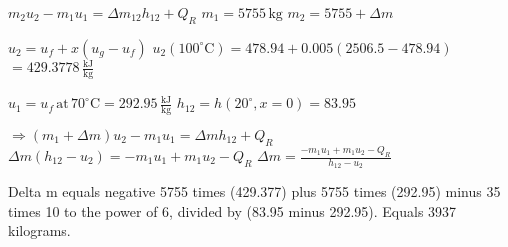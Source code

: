 \( m_2 u_2 - m_1 u_1 = \Delta m_{12} h_{12} + Q_R \)  
\( m_1 = 5755 \, \text{kg} \)  
\( m_2 = 5755 + \Delta m \)  

\( u_2 = u_f + x (u_g - u_f) \)  
\( u_2 (100^\circ \text{C}) = 478.94 + 0.005 (2506.5 - 478.94) \)  
\( = 429.3778 \, \frac{\text{kJ}}{\text{kg}} \)  

\( u_1 = u_f \, \text{at} \, 70^\circ \text{C} = 292.95 \, \frac{\text{kJ}}{\text{kg}} \)  
\( h_{12} = h (20^\circ, x = 0) = 83.95 \)  

\( \Rightarrow (m_1 + \Delta m) u_2 - m_1 u_1 = \Delta m h_{12} + Q_R \)  
\( \Delta m (h_{12} - u_2) = -m_1 u_1 + m_1 u_2 - Q_R \)  
\( \Delta m = \frac{-m_1 u_1 + m_1 u_2 - Q_R}{h_{12} - u_2} \)

Delta m equals negative 5755 times (429.377) plus 5755 times (292.95) minus 35 times 10 to the power of 6, divided by (83.95 minus 292.95).  
Equals 3937 kilograms.